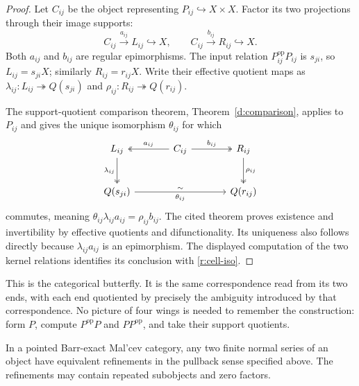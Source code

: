 \begin{proof}
Let $C_{ij}$ be the object representing $P_{ij}\hookrightarrow X\times X$.
Factor its two projections through their image supports:
\[
 C_{ij}\xrightarrow{a_{ij}}L_{ij}\hookrightarrow X,
 \qquad C_{ij}\xrightarrow{b_{ij}}R_{ij}\hookrightarrow X.
\]
Both $a_{ij}$ and $b_{ij}$ are regular epimorphisms.  The input relation
$P_{ij}^{\mathrm{op}}P_{ij}$ is $s_{ji}$, so $L_{ij}=s_{ji}X$; similarly
$R_{ij}=r_{ij}X$.  Write their effective quotient maps as
$\lambda_{ij}:L_{ij}\twoheadrightarrow Q(s_{ji})$ and
$\rho_{ij}:R_{ij}\twoheadrightarrow Q(r_{ij})$.

The support-quotient comparison theorem, Theorem~\ref{d:comparison},
applies to $P_{ij}$ and gives the unique isomorphism $\theta_{ij}$ for
which
\[
\begin{tikzcd}[column sep=large,row sep=large]
L_{ij}\arrow[d,two heads,"\lambda_{ij}"']
 &C_{ij}\arrow[l,two heads,"a_{ij}"']
          \arrow[r,two heads,"b_{ij}"]
 &R_{ij}\arrow[d,two heads,"\rho_{ij}"]\\
Q(s_{ji})\arrow[rr,"\theta_{ij}"',"\sim"]
 &&Q(r_{ij})
\end{tikzcd}
\]
commutes, meaning
$\theta_{ij}\lambda_{ij}a_{ij}=\rho_{ij}b_{ij}$.
The cited theorem proves existence and invertibility by effective
quotients and difunctionality.  Its uniqueness also follows directly
because $\lambda_{ij}a_{ij}$ is an epimorphism.  The displayed computation
of the two kernel relations identifies its conclusion with
\eqref{r:cell-iso}.
\end{proof}

This is the categorical butterfly.  It is the same correspondence read
from its two ends, with each end quotiented by precisely the ambiguity
introduced by that correspondence.  No picture of four wings is needed
to remember the construction: form $P$, compute $P^{\mathrm{op}}P$ and
$PP^{\mathrm{op}}$, and take their support quotients.

\begin{theorem}
\label{r:schreier}
\label{j:schreier}
In a pointed Barr-exact Mal'cev category, any two finite normal series of
an object have equivalent refinements in the pullback sense specified
above.  The refinements may contain repeated subobjects and zero factors.
\end{theorem}

